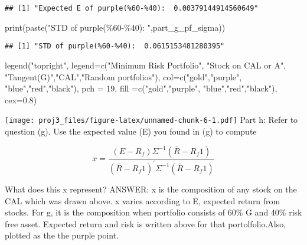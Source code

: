 \documentclass[
]{article}
\newenvironment{Shaded}{\begin{snugshade}}{\end{snugshade}}
\newcommand{\AttributeTok}[1]{\textcolor[rgb]{0.77,0.63,0.00}{#1}}
\newcommand{\DecValTok}[1]{\textcolor[rgb]{0.00,0.00,0.81}{#1}}
\newcommand{\FloatTok}[1]{\textcolor[rgb]{0.00,0.00,0.81}{#1}}
\newcommand{\FunctionTok}[1]{\textcolor[rgb]{0.00,0.00,0.00}{#1}}
\newcommand{\NormalTok}[1]{#1}
\newcommand{\StringTok}[1]{\textcolor[rgb]{0.31,0.60,0.02}{#1}}
\begin{document}
\begin{verbatim}
## [1] "Expected E of purple(%60-%40):  0.00379144914560649"
\end{verbatim}

\begin{Shaded}
\begin{Highlighting}[]
\FunctionTok{print}\NormalTok{(}\FunctionTok{paste}\NormalTok{(}\StringTok{"STD of purple(\%60{-}\%40): "}\NormalTok{,part\_g\_pf\_sigma))}
\end{Highlighting}
\end{Shaded}

\begin{verbatim}
## [1] "STD of purple(%60-%40):  0.0615153481280395"
\end{verbatim}

\begin{Shaded}
\begin{Highlighting}[]
\FunctionTok{legend}\NormalTok{(}\StringTok{"topright"}\NormalTok{, }
       \AttributeTok{legend=}\FunctionTok{c}\NormalTok{(}\StringTok{"Minimum Risk Portfolio"}\NormalTok{, }\StringTok{"Stock on CAL or A"}\NormalTok{, }\StringTok{"Tangent(G)"}\NormalTok{,}\StringTok{"CAL"}\NormalTok{,}\StringTok{"Random portfolios"}\NormalTok{),}
       \AttributeTok{col=}\FunctionTok{c}\NormalTok{(}\StringTok{"gold"}\NormalTok{,}\StringTok{"purple"}\NormalTok{, }\StringTok{"blue"}\NormalTok{,}\StringTok{"red"}\NormalTok{,}\StringTok{"black"}\NormalTok{),}
       \AttributeTok{pch =} \DecValTok{19}\NormalTok{,}
       \AttributeTok{fill =}\FunctionTok{c}\NormalTok{(}\StringTok{"gold"}\NormalTok{,}\StringTok{"purple"}\NormalTok{, }\StringTok{"blue"}\NormalTok{,}\StringTok{"red"}\NormalTok{,}\StringTok{"black"}\NormalTok{),}
       \AttributeTok{cex=}\FloatTok{0.8}\NormalTok{)}
\end{Highlighting}
\end{Shaded}

\texttt{[image: proj3\_files/figure-latex/unnamed-chunk-6-1.pdf]} Part h:
Refer to question (g). Use the expected value (E) you found in (g) to
compute

\begin{equation}
x=\frac{\left(E-R_f\right) \Sigma^{-1}\left(\overline{R}-R_f 1\right)}{\left(\overline{R}-R_f 1\right)^{\prime} \Sigma^{-1}\left(\overline{R}-R_f 1\right)}
\end{equation}

What does this x represent? ANSWER: x is the composition of any stock on
the CAL which was drawn above. x varies according to E, expected return
from stocks. For g, it is the composition when portfolio consists of
60\% G and 40\% risk free asset. Expected return and risk is written
above for that portolfolio.Also, plotted as the the purple point.
\end{document}
